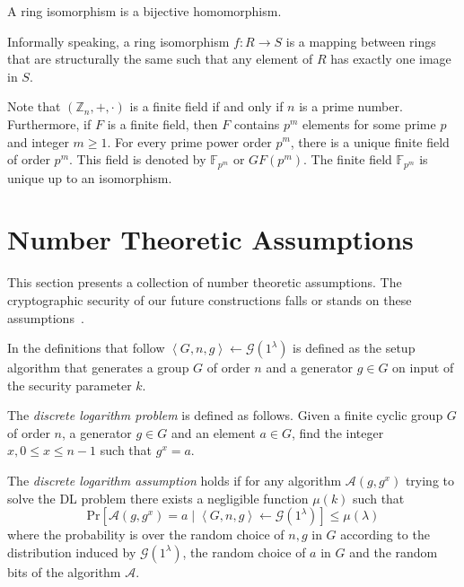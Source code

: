 \begin{defn}
\label{def:ring_isomorphism}
 A ring isomorphism is a bijective homomorphism.
\end{defn}

Informally speaking, a ring isomorphism $f: R \rightarrow S$ is a mapping between rings that are structurally the same such that any element of $R$ has exactly one image in $S$.

Note that $\left( \mathbb{Z}_n, +, \cdot \right)$ is a finite field if and only if $n$ is a prime number. Furthermore, if $F$ is a finite field, then $F$ contains $p^m$ elements for some prime $p$ and integer $m \geq 1$. For every prime power order $p^m$, there is a unique finite field of order $p^m$. This field is denoted by $\mathbb{F}_{p^m}$ or $GF \left( p^m \right)$. The finite field $\mathbb{F}_{p^m}$ is unique up to an isomorphism. 


\section{Number Theoretic Assumptions}
\label{sec:number_theoretic_assumptions}
This section presents a collection of number theoretic assumptions. The cryptographic security of our future constructions falls or stands on these assumptions~\cite{art:Boneh98,book:handbook_of_applied_cryptography}.

In the definitions that follow $\left< G, n, g \right> \leftarrow \mathcal{G} \left( 1^{\lambda} \right)$ is defined as the setup algorithm that generates a group $G$ of order $n$ and a generator $g \in G$ on input of the security parameter $k$.

\begin{defn}[DL]
\label{def:dl}
The \textit{discrete logarithm problem} is defined as follows. Given a finite cyclic group $G$ of order $n$, a generator $g \in G$ and an element $a \in G$, find the integer $x, 0 \leq x \leq n-1$ such that $g^x = a$.

The \textit{discrete logarithm assumption} holds if for any algorithm $\mathcal{A} \left( g, g^x \right)$ trying to solve the DL problem there exists a negligible function $\mu \left( k \right)$ such that 
 \begin{equation*}
  \textrm{Pr} \left[ \mathcal{A} \left( g, g^x \right) = a \mid \left< G, n, g \right> \leftarrow \mathcal{G} \left( 1^{\lambda} \right)\right] \leq \mu \left( \lambda \right)
 \end{equation*}
 where the probability is over the random choice of $n, g$ in $G$ according to the distribution induced by $\mathcal{G} \left( 1^{\lambda} \right)$, the random choice of $a$ in $G$ and the random bits of the algorithm $\mathcal{A}$.
\end{defn}


